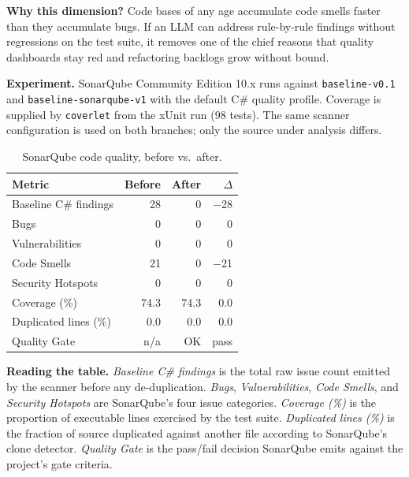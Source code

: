 \documentclass[conference,letterpaper]{IEEEtran}
\begin{document}
\textbf{Why this dimension?} Code bases of any age accumulate code smells faster than they accumulate bugs. If an LLM can address rule-by-rule findings without regressions on the test suite, it removes one of the chief reasons that quality dashboards stay red and refactoring backlogs grow without bound.

\textbf{Experiment.} SonarQube Community Edition 10.x runs against \texttt{baseline-v0.1} and \texttt{baseline-sonarqube-v1} with the default C\# quality profile. Coverage is supplied by \texttt{coverlet} from the xUnit run (98 tests). The same scanner configuration is used on both branches; only the source under analysis differs.

\begin{table}[t]
\caption{SonarQube code quality, before vs.\ after.}
\label{tab:sonar}
\centering
\begin{tabular}{lrrr}
\toprule
Metric & Before & After & $\Delta$ \\
\midrule
Baseline C\# findings & 28 & 0 & $-$28 \\
Bugs & 0 & 0 & 0 \\
Vulnerabilities & 0 & 0 & 0 \\
Code Smells & 21 & 0 & $-$21 \\
Security Hotspots & 0 & 0 & 0 \\
Coverage (\%) & 74.3 & 74.3 & 0.0 \\
Duplicated lines (\%) & 0.0 & 0.0 & 0.0 \\
Quality Gate & n/a\footnotemark[1] & OK & pass \\
\bottomrule
\end{tabular}
\end{table}

\textbf{Reading the table.} \emph{Baseline C\# findings} is the total raw issue count emitted by the scanner before any de-duplication. \emph{Bugs}, \emph{Vulnerabilities}, \emph{Code Smells}, and \emph{Security Hotspots} are SonarQube's four issue categories. \emph{Coverage (\%)} is the proportion of executable lines exercised by the test suite. \emph{Duplicated lines (\%)} is the fraction of source duplicated against another file according to SonarQube's clone detector. \emph{Quality Gate} is the pass/fail decision SonarQube emits against the project's gate criteria.
\end{document}
